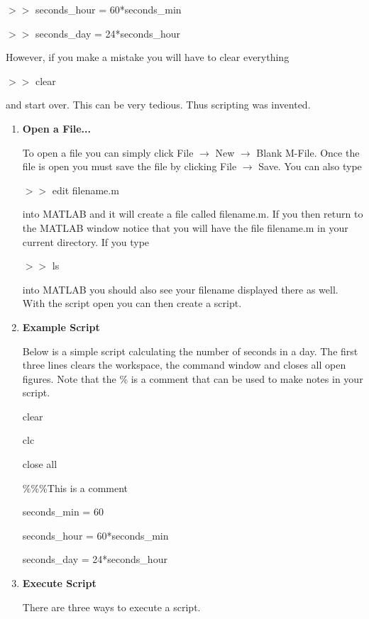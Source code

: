 \begin{enumerate}
$>>$ seconds\_hour = 60*seconds\_min

$>>$ seconds\_day = 24*seconds\_hour

However, if you make a mistake you will have to clear everything

$>>$ clear

and start over. This can be very tedious. Thus scripting was
invented. 

\begin{enumerate}

\item \textbf{ Open a File...}

To open a file you can simply click File $\rightarrow$ New
$\rightarrow$ Blank M-File. Once the file is open you must save the
file by clicking File $\rightarrow$ Save. You can also type

$>>$ edit filename.m

into MATLAB and it will create a file called filename.m. If you then
return to the MATLAB window notice that you will have the file
filename.m in your current directory. If you type

$>>$ ls

into MATLAB you should also see your filename displayed there as
well. With the script open you can then create a script.

\item \textbf{Example Script}

Below is a simple script calculating the number of seconds in a
day. The first three lines clears the workspace, the command window
and closes all open figures. Note that the \% is a comment that can be
used to make notes in your script.

\begin{framed}

clear 

clc

close all

\%\%\%This is a comment

seconds\_min = 60

seconds\_hour = 60*seconds\_min

seconds\_day = 24*seconds\_hour

\end{framed}

\item \textbf{ Execute Script}

There are three ways to execute a script. 

\begin{enumerate}
  

\end{enumerate}
\end{enumerate}
\end{enumerate}
